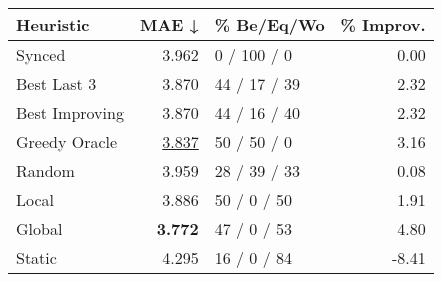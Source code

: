 \begin{tabular}{lrlr}
\toprule
\textbf{Heuristic} & \textbf{MAE ↓} & \textbf{\% Be/Eq/Wo} & \textbf{\% Improv.} \\
\midrule
            Synced &          3.962 &          0 / 100 / 0 &                0.00 \\
\midrule
       Best Last 3 &          3.870 &         44 / 17 / 39 &                2.32 \\
    Best Improving &          3.870 &         44 / 16 / 40 &                2.32 \\
\addlinespace
     Greedy Oracle &          \underline{3.837} &          50 / 50 / 0 &                3.16 \\
            Random &          3.959 &         28 / 39 / 33 &                0.08 \\
\midrule
             Local &          3.886 &          50 / 0 / 50 &                1.91 \\
            Global &          \textbf{3.772} &          47 / 0 / 53 &                4.80 \\
\midrule
            Static &          4.295 &          16 / 0 / 84 &               -8.41 \\
\bottomrule
\end{tabular}

\label{tab:ds_iid_lr05_le1_bs4_Summary}
